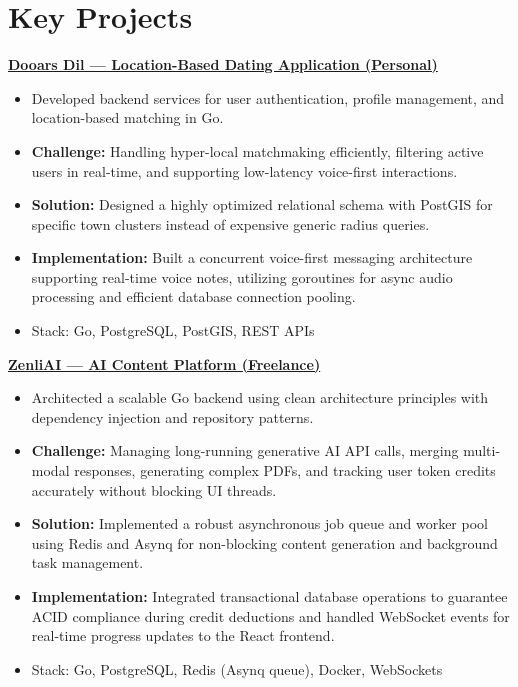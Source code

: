 \documentclass[10pt, letterpaper]{article}
\newenvironment{tightitem}{
    \begin{itemize}[topsep=0pt, itemsep=0pt, parsep=0.3pt, leftmargin=10pt]
}{
    \end{itemize}
}
\begin{document}
\section{Key Projects}

\href{https://github.com/RoyRoki/Dooars_Dil}{\textbf{Dooars Dil — Location-Based Dating Application (Personal)}}  
\begin{tightitem}
\item Developed backend services for user authentication, profile management, and location-based matching in Go.
\item \textbf{Challenge:} Handling hyper-local matchmaking efficiently, filtering active users in real-time, and supporting low-latency voice-first interactions.
\item \textbf{Solution:} Designed a highly optimized relational schema with PostGIS for specific town clusters instead of expensive generic radius queries.
\item \textbf{Implementation:} Built a concurrent voice-first messaging architecture supporting real-time voice notes, utilizing goroutines for async audio processing and efficient database connection pooling.
\item Stack: Go, PostgreSQL, PostGIS, REST APIs
\end{tightitem}

\href{https://github.com/RoyRoki/AI-CREATIVE-CONTENT-GENERATOR}{\textbf{ZenliAI — AI Content Platform (Freelance)}}  
\begin{tightitem}
\item Architected a scalable Go backend using clean architecture principles with dependency injection and repository patterns.
\item \textbf{Challenge:} Managing long-running generative AI API calls, merging multi-modal responses, generating complex PDFs, and tracking user token credits accurately without blocking UI threads.
\item \textbf{Solution:} Implemented a robust asynchronous job queue and worker pool using Redis and Asynq for non-blocking content generation and background task management.
\item \textbf{Implementation:} Integrated transactional database operations to guarantee ACID compliance during credit deductions and handled WebSocket events for real-time progress updates to the React frontend.
\item Stack: Go, PostgreSQL, Redis (Asynq queue), Docker, WebSockets
\end{tightitem}
\end{document}
